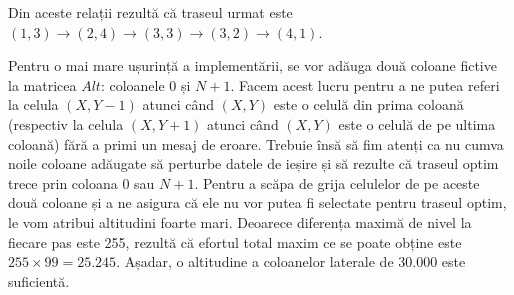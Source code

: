 Din aceste relații rezultă că traseul urmat este $(1,3) \to (2,4) \to (3,3)
\to (3,2) \to (4,1)$.

Pentru o mai mare ușurință a implementării, se vor adăuga două coloane fictive
la matricea $Alt$: coloanele 0 și $N + 1$. Facem acest lucru pentru a ne putea
referi la celula $(X,Y-1)$ atunci când $(X, Y)$ este o celulă din prima
coloană (respectiv la celula $(X,Y+1)$ atunci când $(X,Y)$ este o celulă de pe
ultima coloană) fără a primi un mesaj de eroare. Trebuie însă să fim atenți ca
nu cumva noile coloane adăugate să perturbe datele de ieșire și să rezulte că
traseul optim trece prin coloana 0 sau $N+1$. Pentru a scăpa de grija
celulelor de pe aceste două coloane și a ne asigura că ele nu vor putea fi
selectate pentru traseul optim, le vom atribui altitudini foarte
mari. Deoarece diferența maximă de nivel la fiecare pas este 255, rezultă că
efortul total maxim ce se poate obține este $255 \times 99 = 25.245$. Așadar,
o altitudine a coloanelor laterale de 30.000 este suficientă.

